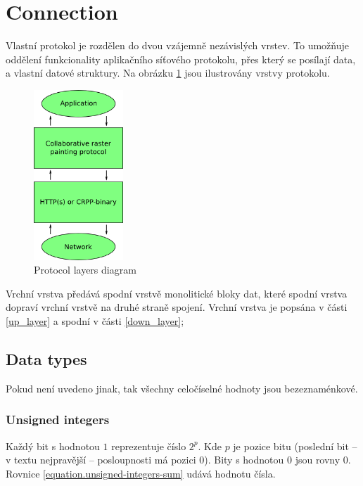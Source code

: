 \part{Connection}
\label{connection}

Vlastní protokol je rozdělen do dvou vzájemně nezávislých vrstev. To umožňuje oddělení funkcionality aplikačního síťového protokolu, přes který se posílají data, a vlastní datové struktury. Na obrázku \ref{connection.pictures.protocol_layers} jsou ilustrovány vrstvy protokolu.

\begin{figure}[h]
  \centering
  \includegraphics[width=0.30\textwidth]{diagrams/protocol_layers.png}
  \caption{Protocol layers diagram}
  \label{connection.pictures.protocol_layers}
\end{figure}

Vrchní vrstva předává spodní vrstvě monolitické bloky dat, které spodní vrstva dopraví vrchní vrstvě na druhé straně spojení. Vrchní vrstva je popsána v části \ref{up_layer} a spodní v části \ref{down_layer};

\chapter{Data types}
\label{connection.data_types}

Pokud není uvedeno jinak, tak všechny celočíselné hodnoty jsou bezeznaménkové.

\section{Unsigned integers}
\label{connection.data_types.unsigned_integer}

Každý bit s hodnotou $1$ reprezentuje číslo $2^{p}$. Kde $p$ je pozice bitu (poslední bit -- v textu nejpravější -- posloupnosti má pozici $0$). Bity s hodnotou $0$ jsou rovny $0$. Rovnice \ref{equation.unsigned-integers-sum} udává hodnotu čísla.

